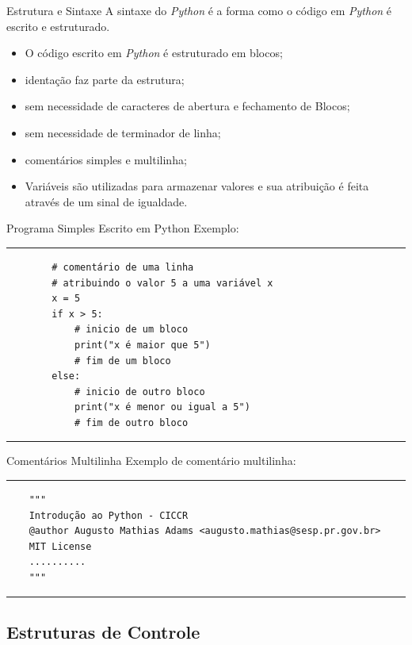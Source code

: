\documentclass{beamer}
\begin{document}
\begin{frame}{Estrutura e Sintaxe}
	\label{sintaxe}
	A sintaxe do \textit{Python} é a forma como o código em \textit{Python} é escrito e
    estruturado. 
    
    \begin{itemize}
    	\item O código escrito em \textit{Python} é estruturado em blocos;
    	\item identação faz parte da estrutura;
    	\item sem necessidade de caracteres de abertura e fechamento de Blocos;
    	\item sem necessidade de terminador de linha;
    	\item comentários simples e multilinha;
    	\item Variáveis são utilizadas para armazenar valores e sua atribuição é feita através de um sinal de igualdade.
    \end{itemize}
	
\end{frame}

\begin{frame}[fragile]{Programa Simples Escrito em Python}
	\label{exemplo_programa_simples}
	Exemplo:
	\rule{\textwidth}{1pt}
	\scriptsize
	\begin{verbatim}
		# comentário de uma linha
		# atribuindo o valor 5 a uma variável x
		x = 5
		if x > 5: 
			# inicio de um bloco
			print("x é maior que 5")
			# fim de um bloco
		else:
			# inicio de outro bloco
			print("x é menor ou igual a 5")
			# fim de outro bloco
	\end{verbatim}
	\rule{\textwidth}{1pt}
\end{frame}

\begin{frame}[fragile]{Comentários Multilinha}
	\label{comentarios_multilinha}
	Exemplo de comentário multilinha:
	\rule{\textwidth}{1pt}
	\scriptsize
	\begin{verbatim}
	"""
	Introdução ao Python - CICCR
	@author Augusto Mathias Adams <augusto.mathias@sesp.pr.gov.br>
	MIT License
	..........
	"""
	\end{verbatim}

	\rule{\textwidth}{1pt}	
\end{frame}


\subsection{Estruturas de Controle}
\end{document}

